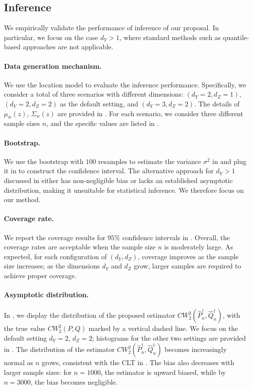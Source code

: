 \documentclass{article}
\theoremstyle{plain}
\theoremstyle{definition}
\def\PP{P}
\def\QQ{Q}
\theoremstyle{plain}
\newcommand{\Cwass}{{CW}}
\begin{document}
\subsection{Inference}\label{sec:empirical.inference}
We empirically validate the performance of inference of our proposal. In particular, we focus on the case $d_Y > 1$, where standard methods such as quantile-based approaches are not applicable.


\paragraph{Data generation mechanism.} 
We use the location model to evaluate the inference performance. Specifically, we consider a total of three scenarios with different dimensions: $(d_Y = 2, d_Z = 1)$, $(d_Y = 2, d_Z = 2)$ as the default setting, and $(d_Y = 3, d_Z = 2)$. The details of $\mu_w(z)$, $\Sigma_w(z)$ are provided in .
For each scenario, we consider three different sample sizes $n$, and the specific values are listed in .

\paragraph{Bootstrap.} We use the bootstrap with $100$ resamples to estimate the variance $\sigma^2$ in  and plug it in to construct the confidence interval.
The alternative approach for $d_Y>1$ discussed in  either has non-negligible bias or lacks an established asymptotic distribution, making it unsuitable for statistical inference. We therefore focus on our method.


\paragraph{Coverage rate.}
We report the coverage results for $95\%$ confidence intervals in . 
Overall, the coverage rates are acceptable when the sample size $n$ is moderately large.
As expected, for each configuration of $(d_Y, d_Z)$, coverage improves as the sample size increases; 
as the dimensions $d_Y$ and $d_Z$ grow, larger samples are required to achieve proper coverage.


\paragraph{Asymptotic distribution.} 
In , we display the distribution of the proposed estimator $\Cwass^2_2(\widehat \PP_n^\dagger,\widehat \QQ^\dagger_n)$, with the true value $\Cwass_2^2(P,Q)$ marked by a vertical dashed line. 
We focus on the default setting $d_Y=2$, $d_Z=2$; histograms for the other two settings are provided in . The distribution of the estimator $\Cwass_2^2(\widehat{\PP}_n^\dagger,\widehat{\QQ}_n^\dagger)$ becomes increasingly normal as $n$ grows, consistent with the CLT in . 
The bias also decreases with larger sample sizes: for $n=1000$, the estimator is upward biased, while by $n=3000$, the bias becomes negligible.
\end{document}
